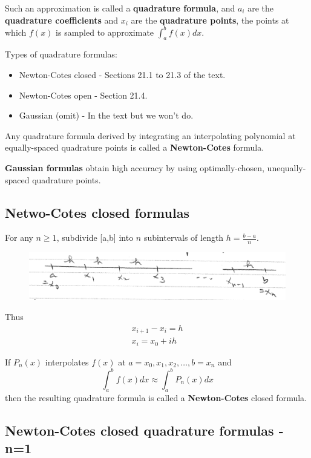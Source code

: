 \documentclass [titlepage,12pt,letter] {article}
\begin{document}
Such an approximation is called a {\bf quadrature formula}, and $a_i$ are the {\bf quadrature coefficients} and $x_i$ are the {\bf quadrature points}, the points at which $f(x)$ is sampled to approximate $\int_{a}^{b} f(x)dx$. 

Types of quadrature formulas: 
\begin{itemize} 
\item Newton-Cotes closed - Sections 21.1 to 21.3 of the text.
\item Newton-Cotes open - Section 21.4.
\item Gaussian (omit) - In the text but we won't do.
\end{itemize} 

Any quadrature formula derived by integrating an interpolating polynomial at equally-spaced quadrature points is called a {\bf Newton-Cotes} formula. 

{\bf Gaussian formulas} obtain high accuracy by using optimally-chosen, unequally-spaced quadrature points. 

\subsection{Netwo-Cotes closed formulas} 

For any $n \geq 1$, subdivide [a,b] into $n$ subintervals of length 
$h = \frac{b-a}{n}$. 


\begin{figure} 
  \centering
  \includegraphics[scale=0.6]{linear_step_size}
  \label{fig:linear}
\end{figure}



Thus 
\begin{align*} 
x_{i+1} - x_{i} = h \\ 
x_i = x_0 + ih 
\end{align*} 

If $P_n(x)$ interpolates $f(x)$ at $a=x_0, x_1, x_2, \dots, b=x_n$ 
and 
\[
\int_{a}^{b} f(x)dx \approx \int_{a}^{b} P_n(x)dx 
\]
\noindent 
then the resulting quadrature formula is called a {\bf Newton-Cotes} closed formula. 


\subsection{Newton-Cotes closed quadrature formulas - n=1} 
\end{document}
